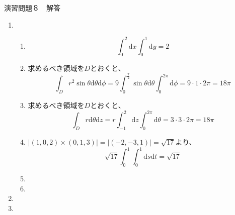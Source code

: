 \documentclass{jarticle}
\def\d{\mathrm d}
\begin{document}
\begin{center} {\Large 演習問題８　解答} \end{center}
\begin{enumerate}
  \item
    \begin{enumerate}
      \item
        \[ \int_0^2 \d x \int_0^1 \d y = 2 \]
      \item
        求めるべき領域を$D$とおくと、
        \[ \int_D r^2 \sin \theta \d \theta \d \phi = 9 \int_0^{\frac{\pi}{2}} \sin \theta \d \theta \int_0^{2\pi} \d \phi = 9 \cdot 1 \cdot 2 \pi = 18 \pi \]
      \item
        求めるべき領域を$D$とおくと、
        \[ \int_D r \d \theta \d z = r \int_{-1}^2 \d z \int_0^{2\pi} \d \theta = 3 \cdot 3 \cdot 2 \pi = 18 \pi \]
      \item
        $|(1,0,2) \times (0,1,3)| = |(-2,-3,1)| = \sqrt{17}$より、
        \[ \sqrt{17} \int_0^1 \int_0^1 \d s \d t = \sqrt{17} \]
      \item
      \item
    \end{enumerate}
  \item
  \item
\end{enumerate}
\end{document}
